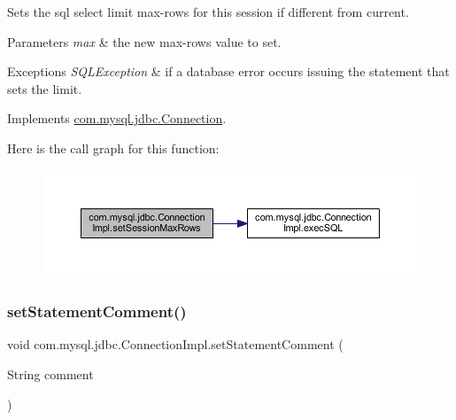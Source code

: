 Sets the sql select limit max-\/rows for this session if different from current.


\begin{DoxyParams}{Parameters}
{\em max} & the new max-\/rows value to set. \\
\hline
\end{DoxyParams}

\begin{DoxyExceptions}{Exceptions}
{\em S\+Q\+L\+Exception} & if a database error occurs issuing the statement that sets the limit. \\
\hline
\end{DoxyExceptions}


Implements \mbox{\hyperlink{interfacecom_1_1mysql_1_1jdbc_1_1_connection}{com.\+mysql.\+jdbc.\+Connection}}.

Here is the call graph for this function\+:\nopagebreak
\begin{figure}[H]
\begin{center}
\leavevmode
\includegraphics[width=350pt]{classcom_1_1mysql_1_1jdbc_1_1_connection_impl_abdb4abb6fabad5cd48ac8b4d4e9c37cd_cgraph}
\end{center}
\end{figure}
\mbox{\label{classcom_1_1mysql_1_1jdbc_1_1_connection_impl_ad8da7624bbff49fa21cc06227fa66258}} 
\subsubsection{\texorpdfstring{set\+Statement\+Comment()}{setStatementComment()}}
{\footnotesize\ttfamily void com.\+mysql.\+jdbc.\+Connection\+Impl.\+set\+Statement\+Comment (\begin{DoxyParamCaption}\item[{String}]{comment }\end{DoxyParamCaption})}

